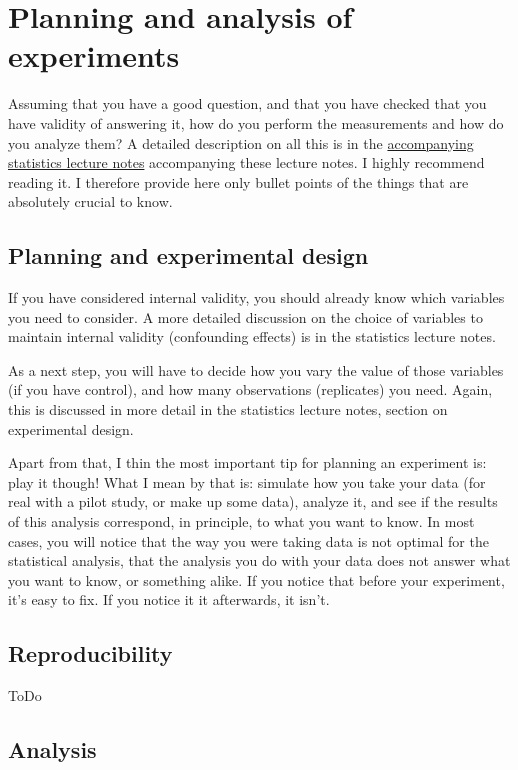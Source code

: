 \documentclass{tufte-book}
\begin{document}
\section{Planning and analysis of experiments} 

Assuming that you have a good question, and that you have checked that you have validity of answering it, how do you perform the measurements and how do you analyze them? A detailed description on all this is in the \href{https://florianhartig.github.io/Statistics/}{accompanying statistics lecture notes} accompanying these lecture notes. I highly recommend reading it. I therefore provide here only bullet points of the things that are absolutely crucial to know. 


\subsection{Planning and experimental design}

If you have considered internal validity, you should already know which variables you need to consider. A more detailed discussion on the choice of variables to maintain internal validity (confounding effects) is in the statistics lecture notes. 

As a next step, you will have to decide how you vary the value of those variables (if you have control), and how many observations (replicates) you need. Again, this is discussed in more detail in the statistics lecture notes, section on experimental design.

Apart from that, I thin the most important tip for planning an experiment is: play it though! What I mean by that is: simulate how you take your data (for real with a pilot study, or make up some data), analyze it, and see if the results of this analysis correspond, in principle, to what you want to know. In most cases, you will notice that the way you were taking data is not optimal for the statistical analysis, that the analysis you do with your data does not answer what you want to know, or something alike. If you notice that before your experiment, it's easy to fix. If you notice it it afterwards, it isn't. 


\subsection{Reproducibility}

ToDo

\subsection{Analysis}
\end{document}
